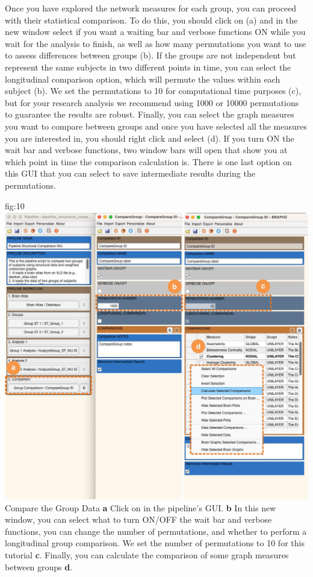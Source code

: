 \documentclass[justified]{tufte-handout}
\begin{document}
Once you have explored the network measures for each group, you can proceed with their statistical comparison. To do this, you should click on  (a) and in the new window select if you want a waiting bar and verbose functions ON while you wait for the analysis to finish, as well as how many permutations you want to use to assess differences between groups (b). If the groups are not independent but represent the same subjects in two different points in time, you can select the longitudinal comparison option, which will permute the values within each subject (b). We set the permutations to 10 for computational time purposes (c), but for your research analysis we recommend using 1000 or 10000 permutations to guarantee the results are robust. Finally, you can select the graph measures you want to compare between groups and once you have selected all the measures you are interested in, you should right click and select  (d). If you turn ON the wait bar and verbose functions, two window bars will open that show you at which point in time the comparison calculation is. There is one last option on this GUI that you can select to save intermediate results during the permutations.

	{fig:10}
	{\includegraphics{fig10.jpg}}
	{Compare the Group Data}
	{
	{\bf a} Click on  in the pipeline's GUI.
	{\bf b} In this new window, you can select what to turn ON/OFF the wait bar and verbose functions, you can change the number of permutations, and whether to perform a longitudinal group comparison. We set the number of permutations to 10 for this tutorial {\bf c}. Finally, you can calculate the comparison of some graph measures between groups {\bf d}.
	}
\end{document}
